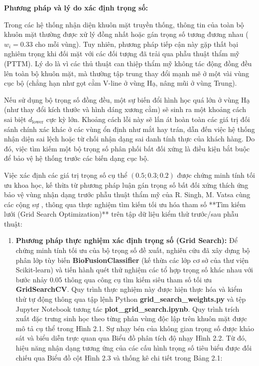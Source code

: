 \noindent \textbf{Phương pháp và lý do xác định trọng số:}

Trong các hệ thống nhận diện khuôn mặt truyền thống, thông tin của toàn bộ khuôn mặt thường được xử lý đồng nhất hoặc gán trọng số tương đương nhau ($w_i = 0.33$ cho mỗi vùng). Tuy nhiên, phương pháp tiếp cận này gặp thất bại nghiêm trọng khi đối mặt với các đối tượng đã trải qua phẫu thuật thẩm mỹ (PTTM). Lý do là vì các thủ thuật can thiệp thẩm mỹ không tác động đồng đều lên toàn bộ khuôn mặt, mà thường tập trung thay đổi mạnh mẽ ở một vài vùng cục bộ (chẳng hạn như gọt cằm V-line ở vùng Hạ, nâng mũi ở vùng Trung). 

Nếu sử dụng bộ trọng số đồng đều, một sự biến đổi hình học quá lớn ở vùng Hạ (như thay đổi kích thước và hình dáng xương cằm) sẽ sinh ra một khoảng cách sai biệt $d_{\text{lower}}$ cực kỳ lớn. Khoảng cách lỗi này sẽ lấn át hoàn toàn các giá trị đối sánh chính xác khác ở các vùng ổn định như mắt hay trán, dẫn đến việc hệ thống nhận diện sai lệch hoặc từ chối nhận dạng sai danh tính thực của khách hàng. Do đó, việc tìm kiếm một bộ trọng số phân phối bất đối xứng là điều kiện bắt buộc để bảo vệ hệ thống trước các biến dạng cục bộ.

Việc xác định các giá trị trọng số cụ thể $(0.5; 0.3; 0.2)$ được chứng minh tính tối ưu khoa học, kế thừa từ phương pháp luận gán trọng số bất đối xứng thích ứng bảo vệ vùng nhận dạng trước phẫu thuật thẩm mỹ của R. Singh, M. Vatsa cùng các cộng sự \cite{singh2010database, bhatt2013evolutionary}, thông qua thực nghiệm tìm kiếm tối ưu hóa tham số **Tìm kiếm lưới (Grid Search Optimization)** trên tập dữ liệu kiểm thử trước/sau phẫu thuật:

\begin{enumerate}
    \item \textbf{Phương pháp thực nghiệm xác định trọng số (Grid Search):}
    Để chứng minh tính tối ưu của bộ trọng số đề xuất, nghiên cứu đã xây dựng bộ phân lớp tùy biến \textbf{BioFusionClassifier} (kế thừa các lớp cơ sở của thư viện Scikit-learn) và tiến hành quét thử nghiệm các tổ hợp trọng số khác nhau với bước nhảy $0.05$ thông qua công cụ tìm kiếm siêu tham số tối ưu \textbf{GridSearchCV}. Quy trình thực nghiệm này được hiện thực hóa và kiểm thử tự động thông qua tập lệnh Python \textbf{grid\_search\_weights.py} và tệp Jupyter Notebook tương tác \textbf{plot\_grid\_search.ipynb}. Quy trình trích xuất đặc trưng sinh học theo từng phân vùng độc lập trên khuôn mặt được mô tả cụ thể trong Hình 2.1. Sự nhạy bén của không gian trọng số được khảo sát và biểu diễn trực quan qua Biểu đồ phân tích độ nhạy Hình 2.2. Từ đó, hiệu năng nhận dạng tương ứng của các cấu hình trọng số tiêu biểu được đối chiếu qua Biểu đồ cột Hình 2.3 và thống kê chi tiết trong Bảng 2.1:
\end{enumerate}

